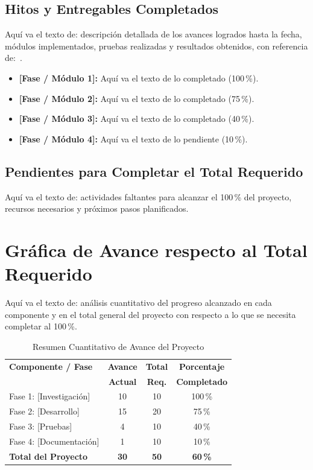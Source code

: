 \documentclass[conference]{IEEEtran}
\begin{document}
\subsection{Hitos y Entregables Completados}

Aquí va el texto de: descripción detallada de los avances logrados hasta la
fecha, módulos implementados, pruebas realizadas y resultados obtenidos,
con referencia de:~\cite{ejemplo_referencia}.

\begin{itemize}
  \item \textbf{[Fase / Módulo 1]:} Aquí va el texto de lo completado (100\,\%).
  \item \textbf{[Fase / Módulo 2]:} Aquí va el texto de lo completado (75\,\%).
  \item \textbf{[Fase / Módulo 3]:} Aquí va el texto de lo completado (40\,\%).
  \item \textbf{[Fase / Módulo 4]:} Aquí va el texto de lo pendiente (10\,\%).
\end{itemize}

\subsection{Pendientes para Completar el Total Requerido}

Aquí va el texto de: actividades faltantes para alcanzar el 100\,\% del
proyecto, recursos necesarios y próximos pasos planificados.

\section{Gráfica de Avance respecto al Total Requerido}

Aquí va el texto de: análisis cuantitativo del progreso alcanzado en cada
componente y en el total general del proyecto con respecto a lo que se
necesita completar al 100\,\%.

\begin{table}[h]
\centering
\caption{Resumen Cuantitativo de Avance del Proyecto}
\label{tab:avance_proyecto}
\begin{tabular}{@{}lccc@{}}
\toprule
\textbf{Componente / Fase} & \textbf{Avance} & \textbf{Total} & \textbf{Porcentaje} \\
                           & \textbf{Actual} & \textbf{Req.}  & \textbf{Completado} \\
\midrule
Fase 1: [Investigación]   & 10 & 10 & 100\,\% \\
Fase 2: [Desarrollo]      & 15 & 20 & 75\,\%  \\
Fase 3: [Pruebas]         & 4  & 10 & 40\,\%  \\
Fase 4: [Documentación]   & 1  & 10 & 10\,\%  \\
\midrule
\textbf{Total del Proyecto} & \textbf{30} & \textbf{50} & \textbf{60\,\%} \\
\bottomrule
\end{tabular}
\end{table}
\end{document}
